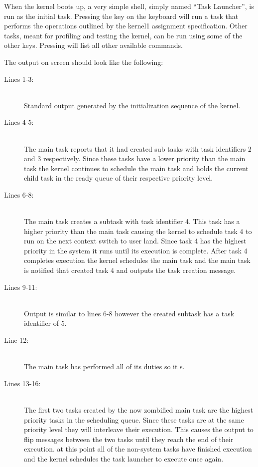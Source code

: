 \documentclass[pdftex,10pt,a4paper]{article}
\begin{document}
When the kernel boots up, a very simple shell, simply named ``Task
Launcher'', is run as the initial task. Pressing the  key on
the keyboard will run a task that performs the operations outlined by
the kernel1 assignment specification. Other tasks, meant for
profiling and testing the kernel, can be run using some of the other
keys. Pressing  will list all other available commands.

The output on screen should look like the following:



\begin{description}
\item[Lines 1-3:] \hfill \\
  Standard output generated by the initialization sequence of the kernel.

\item[Lines 4-5:] \hfill \\
  The main task reports that it had created sub tasks with task
  identifiers 2 and 3 respectively. Since these tasks have a lower
  priority than the main task the kernel continues to schedule the main
  task and holds the current child task in the ready queue of their
  respective priority level.

\item[Lines 6-8:] \hfill \\
  The main task creates a subtask with task identifier 4. This task has
  a higher priority than the main task causing the kernel to schedule
  task 4 to run on the next context switch to user land. Since task 4
  has the highest priority in the system it runs until its execution
  is complete. After task 4 completes execution the kernel schedules
  the main task and the main task is notified that created task 4 and
  outputs the task creation message.

\item[Lines 9-11:] \hfill \\
  Output is similar to lines 6-8 however the created subtask has a task
  identifier of 5.

\item[Line 12:] \hfill \\
  The main task has performed all of its duties so it s.

\item[Lines 13-16:] \hfill \\
  The first two tasks created by the now zombified main task are the
  highest priority tasks in the scheduling queue. Since these tasks
  are at the same priority level they will interleave their
  execution. This causes the output to flip messages between the two
  tasks until they reach the end of their execution. at this point all
  of the non-system tasks have finished execution and the kernel
  schedules the task launcher to execute once again.

\end{description}
\end{document}
